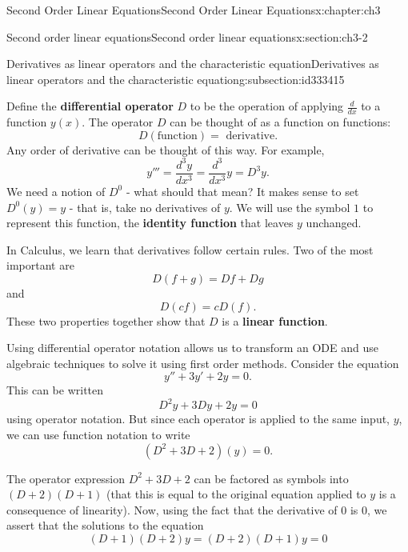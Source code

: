 \documentclass[oneside,10pt,]{book}
\newcommand{\terminology}[1]{\textbf{#1}}
\numberwithin{equation}{section}
\numberwithin{equation}{section}
\begin{document}
\begin{chapterptx}{Second Order Linear Equations}{}{Second Order Linear Equations}{}{}{x:chapter:ch3}
\begin{sectionptx}{Second order linear equations}{}{Second order linear equations}{}{}{x:section:ch3-2}
\begin{subsectionptx}{Derivatives as linear operators and the characteristic equation}{}{Derivatives as linear operators and the characteristic equation}{}{}{g:subsection:id333415}
\par
Define the \terminology{differential operator} \(D\) to be the operation of applying \(\frac{d}{dx}\) to a function \(y(x)\). The operator \(D\) can be thought of as a function on functions:%
\begin{equation*}
D(\text{function}) = \text{ derivative}.
\end{equation*}
Any order of derivative can be thought of this way. For example,%
\begin{equation*}
y''' = \frac{d^3 y}{dx^3} = \frac{d^3}{dx^3} y = D^3 y.
\end{equation*}
We need a notion of \(D^0\) - what should that mean? It makes sense to set \(D^0(y) = y\) - that is, take no derivatives of \(y\). We will use the symbol \(1\) to represent this function, the \terminology{identity function} that leaves \(y\) unchanged.%
\par
In Calculus, we learn that derivatives follow certain rules. Two of the most important are%
\begin{equation*}
D(f + g) = Df + Dg
\end{equation*}
and%
\begin{equation*}
D(cf) = cD(f).
\end{equation*}
These two properties together show that \(D\) is a \terminology{linear function}.%
\par
Using differential operator notation allows us to transform an ODE and use algebraic techniques to solve it using first order methods. Consider the equation%
\begin{equation*}
y'' + 3 y ' + 2 y = 0.
\end{equation*}
This can be written%
\begin{equation*}
D^2 y + 3 D y + 2 y = 0
\end{equation*}
using operator notation. But since each operator is applied to the same input, \(y\), we can use function notation to write%
\begin{equation*}
(D^2 + 3D + 2)(y) = 0.
\end{equation*}
%
\par
The operator expression \(D^2 + 3D + 2\) can be factored as symbols into \((D + 2)(D + 1)\) (that this is equal to the original equation applied to \(y\) is a consequence of linearity). Now, using the fact that the derivative of 0 is 0, we assert that the solutions to the equation%
\begin{equation*}
(D + 1)(D + 2)y = (D + 2)(D+1)y = 0
\end{equation*}

\end{subsectionptx}
\end{sectionptx}
\end{chapterptx}
\end{document}
